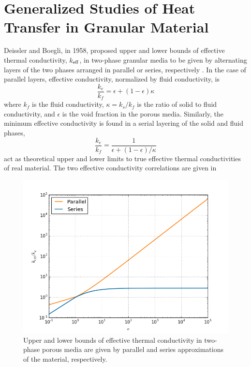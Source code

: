 \section{Generalized Studies of Heat Transfer in Granular Material}
Deissler and Boegli, in 1958, proposed upper and lower bounds of effective thermal conductivity, $k_\text{eff}$, in two-phase granular media to be given by alternating layers of the two phases arranged in parallel or series, respectively \cite{Deissler1958}. In the case of parallel layers, effective conductivity, normalized by fluid conductivity, is
\begin{equation}\label{eq:keff-parallel}
	\frac{k_e}{k_f} = \epsilon + (1-\epsilon)\kappa
\end{equation}
where $k_f$ is the fluid conductivity, $\kappa = k_s/k_f$ is the ratio of solid to fluid conductivity, and $\epsilon$ is the void fraction in the porous media. Similarly, the minimum effective conductivity is found in a serial layering of the solid and fluid phases,
\begin{equation}\label{eq:keff-series}
	\frac{k_e}{k_f} = \frac{1}{\epsilon + (1-\epsilon)/\kappa}
\end{equation}
 act as theoretical upper and lower limits to true effective thermal conductivities of real material. The two effective conductivity correlations are given in 

\begin{figure}[!h]
    \centering
    \includegraphics[width=\textwidth]{figures/keff-kappa-series-parallel}
    \caption{Upper and lower bounds of effective thermal conductivity in two-phase porous media are given by parallel and series approximations of the material, respectively.}
    \label{fig:kappa-series-parallel}
\end{figure}

